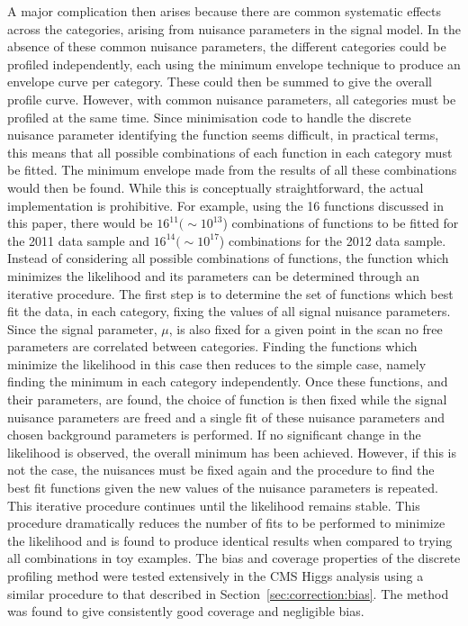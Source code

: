 A major complication then arises because there are common systematic effects
across the categories, arising from nuisance parameters in the signal
model.
In the absence of these common nuisance parameters,
the different categories could be profiled independently, each using the
minimum envelope technique to produce an envelope curve per category.
These could then
be summed to give the overall profile curve. However, with common
nuisance parameters, all categories must be profiled at the same time.
Since minimisation code to handle the 
discrete nuisance parameter identifying the
function seems difficult, in practical terms, this means that all possible
combinations of each function in each category must be fitted.
The minimum envelope made from the results of all these combinations would
then be found. While this is conceptually straightforward, the actual
implementation is prohibitive. For example, using the 16 functions
discussed in this paper, there would be $16^{11} (\sim 10^{13}$) combinations 
of functions to be fitted for the 2011 data sample and $16^{14} (\sim 10^{17}$)
combinations for the 2012 data sample.
Instead of considering all possible combinations of functions, the function 
which minimizes the likelihood and its parameters can be determined through 
an iterative procedure. The first step is to determine the set of functions 
which best fit the data, in each category, fixing the values of all 
signal nuisance parameters.
Since the signal parameter, $\mu$, is also fixed for a given point in the scan 
no free parameters are correlated between categories.
Finding the functions which minimize the likelihood in 
this case then reduces to the simple case, namely finding the minimum in each 
category independently. 
Once these functions, and their parameters, are found, the choice of function 
is then fixed while the signal nuisance parameters are freed and a 
single fit of these
nuisance parameters and chosen background parameters is performed.
If no significant change in the likelihood is observed, the overall minimum
has been 
achieved. However, if this is not the case, the nuisances must be fixed again 
and the procedure to find the best fit functions given the new values of the 
nuisance parameters is repeated.
This iterative procedure continues until the likelihood remains stable.
This procedure dramatically reduces the number of fits to be performed 
to minimize the likelihood and is found to produce identical results when 
compared to trying all combinations in toy examples. 
The bias and coverage properties of the discrete profiling method were tested 
extensively in the CMS Higgs analysis using a similar procedure to that described in 
Section~\ref{sec:correction:bias}. The method was found to give consistently good 
coverage and negligible bias.







